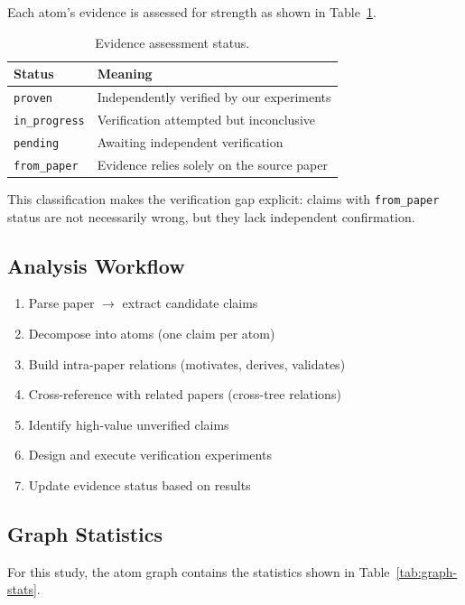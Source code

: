\documentclass[11pt,a4paper]{article}
\begin{document}
Each atom's evidence is assessed for strength as shown in Table~\ref{tab:evidence-status}.

\begin{table}[H]
\centering
\caption{Evidence assessment status.}
\label{tab:evidence-status}
\begin{tabular}{ll}
\toprule
\textbf{Status} & \textbf{Meaning} \\
\midrule
\texttt{proven} & Independently verified by our experiments \\
\texttt{in\_progress} & Verification attempted but inconclusive \\
\texttt{pending} & Awaiting independent verification \\
\texttt{from\_paper} & Evidence relies solely on the source paper \\
\bottomrule
\end{tabular}
\end{table}

This classification makes the verification gap explicit: claims with \texttt{from\_paper} status are not necessarily wrong, but they lack independent confirmation.

\subsection{Analysis Workflow}

\begin{enumerate}
    \item Parse paper $\to$ extract candidate claims
    \item Decompose into atoms (one claim per atom)
    \item Build intra-paper relations (motivates, derives, validates)
    \item Cross-reference with related papers (cross-tree relations)
    \item Identify high-value unverified claims
    \item Design and execute verification experiments
    \item Update evidence status based on results
\end{enumerate}

\subsection{Graph Statistics}

For this study, the atom graph contains the statistics shown in Table~\ref{tab:graph-stats}.
\end{document}
